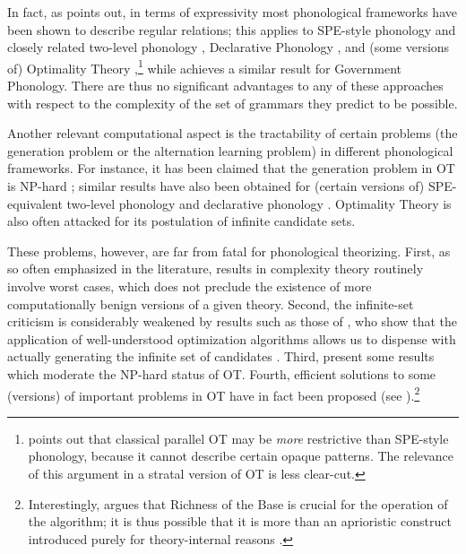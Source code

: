 In fact, as \citet{Heinz-2011-CPF,Heinz-2011-CPGLF} points out, in terms of expressivity most phonological frameworks have been shown to describe regular relations; this applies to SPE\hyp style phonology and  closely related two-level phonology \citep{kaplan94:_regul}, Declarative Phonology \citep[§3]{Heinz-2011-CPGLF}, and (some versions of) Optimality Theory \citep{karttunen98},\footnote{\citet{Heinz-2011-CPGLF} points out that classical parallel OT may be \emph{more} restrictive than SPE\hyp style phonology, because it cannot describe certain opaque patterns. The relevance of this argument in a stratal version of OT is less clear-cut.} while \citet{Graf10FOLLI} achieves a similar result for Government Phonology. There are thus no significant advantages to any of these approaches with respect to the complexity of the set of grammars they predict to be possible.

Another relevant computational aspect is the tractability of certain problems (\eg the generation problem or the alternation learning problem) in different phonological frameworks. For instance, it has been claimed that the generation problem in OT is NP-hard \citep{eisner97:_effic_optim_theor,eisner00:_easy_hard_const_rankin_optim_theor,wareham98:_system,idsardi06:_optim_theor}; similar results have also been obtained for (certain versions of) SPE\hyp equivalent two\hyp level phonology \citep{barton87:_comput} and declarative phonology \citep{Heinz-2011-CPGLF}. Optimality Theory is also often attacked for its postulation of infinite candidate sets.

These problems, however, are far from fatal for phonological theorizing. First, as so often emphasized in the literature, results in complexity theory routinely involve worst cases, which does not preclude the existence of more computationally benign versions of a given theory. Second, the infinite\hyp set criticism is considerably weakened by results such as those of \citet{Rig04,riggle09:_gener,riggle09:_violat_optim_theor,seeker09:_optim_theor}, who show that the application of well\hyp understood optimization algorithms allows us to dispense with actually generating the infinite set of candidates \citep[\cf also][]{hammond09}. Third, \citet{riggle09:_optim_theor,heinz09:_evaluat_compl_optim_theor} present some results which moderate the NP-hard status of OT. Fourth, efficient solutions to some (versions) of important problems in OT have in fact been proposed (see \eg \citealp{jarosz06:_richn}).\footnote{Interestingly, \citet{jarosz06:_richn} argues that Richness of the Base is crucial for the operation of the algorithm; it is thus possible that it is more than an aprioristic construct introduced purely for theory\hyp internal reasons \citep[contrast][§1.6.4]{hale-reiss2008}.}


